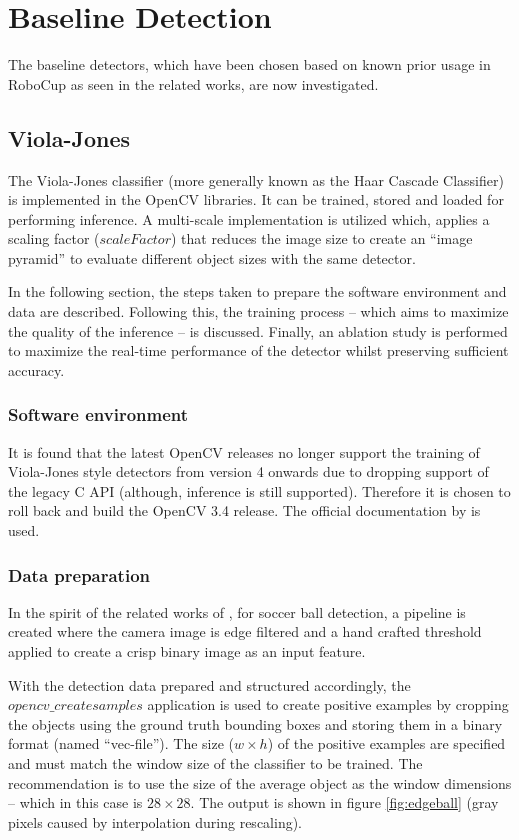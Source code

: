 \documentclass[a4paper,twoside,12pt]{report}
\begin{document}
\section{Baseline Detection}

The baseline detectors, which have been chosen based on known prior usage in RoboCup as seen in the related works, are now investigated.

\subsection{Viola-Jones}

The Viola-Jones classifier (more generally known as the Haar Cascade Classifier) is implemented in the OpenCV libraries. It can be trained, stored and loaded for performing inference. A multi-scale implementation is utilized which, applies a scaling factor ($scaleFactor$) that reduces the image size to create an ``image pyramid'' to evaluate different object sizes with the same detector. 

In the following section, the steps taken to prepare the software environment and data are described. Following this, the training process -- which aims to maximize the quality of the inference -- is discussed. Finally, an ablation study is performed to maximize the real-time performance of the detector whilst preserving sufficient accuracy.

\subsubsection{Software environment}

It is found that the latest OpenCV releases no longer support the training of Viola-Jones style detectors from version 4 onwards due to dropping support of the legacy C API (although, inference is still supported). Therefore it is chosen to roll back and build the OpenCV 3.4 release. The official documentation by \cite{vjdataset} is used.

\subsubsection{Data preparation}

In the spirit of the related works of \cite{robovj}, for soccer ball detection, a pipeline is created where the camera image is edge filtered and a hand crafted threshold applied to create a crisp binary image as an input feature. 

With the detection data prepared and structured accordingly, the $opencv\_createsamples$ application is used to create positive examples by cropping the objects using the ground truth bounding boxes and storing them in a binary format (named ``vec-file''). The size ($w\times h$) of the positive examples are specified and must match the window size of the classifier to be trained. The \cite{vjdataset} recommendation is to use the size of the average object as the window dimensions -- which in this case is $28\times 28$. The output is shown in figure \ref{fig:edgeball} (gray pixels caused by interpolation during rescaling).
\end{document}
